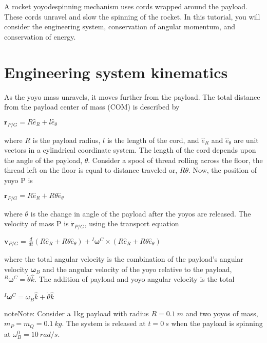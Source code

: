 \documentclass[letterpaper,10pt,english]{sphinxmanual}
\begin{document}
A rocket yoyo\sphinxhyphen{}despinning mechanism uses cords wrapped around the
payload. These cords unravel and slow the spinning of the rocket. In
this tutorial, you will consider the engineering system, conservation of
angular momentum, and conservation of energy.


\section{Engineering system \sphinxhyphen{} kinematics}
\label{\detokenize{module_04/yoyo-despin_02:engineering-system-kinematics}}
As the yoyo mass unravels, it moves further from the payload. The total
distance from the payload center of mass (COM) is described by

\(\mathbf{r}_{P/G} = R\hat{e}_R + l\hat{e}_{\theta}\)

where \(R\) is the payload radius, \(l\) is the length of the cord, and
\(\hat{e}_R\) and \(\hat{e}_{\theta}\) are unit vectors in a cylindrical
coordinate system. The length of the cord depends upon the angle of the
payload, \(\theta\). Consider a spool of thread rolling across the floor,
the thread left on the floor is equal to distance traveled or,
\(R\theta\). Now, the position of yoyo P is

\(\mathbf{r}_{P/G} = R\hat{e}_R + R\theta\hat{e}_{\theta}\)

where \(\theta\) is the change in angle of the payload after the yoyos are
released. The velocity of mass P is \(\dot{\mathbf{r}}_{P/G}\), using the transport
equation

\(\mathbf{v}_{P/G} = \frac{d}{dt}(R\hat{e}_R + R\theta\hat{e}_{\theta}) +
{}^I\mathbf{\omega}^C \times(R\hat{e}_R + R\theta\hat{e}_{\theta})\)

where the total angular velocity is the combination of the payload’s
angular velocity \(\mathbf{\omega}_B\) and the angular velocity of the
yoyo relative to the payload, \({}^B \mathbf{\omega}^C=\dot{\theta}\hat{k}\). The addition of
payload and yoyo angular velocity is the total

\({}^I\mathbf{\omega}^C = \omega_B \hat{k} +
\dot{\theta}\hat{k}\)

\begin{sphinxadmonition}{note}{Note:}
Consider a 1\sphinxhyphen{}kg payload with radius \(R=0.1~m\) and two yoyos of mass,
\(m_P=m_Q=0.1~kg\). The system is released at \(t = 0~s\) when the payload
is spinning at \(\omega_B^0=10~rad/s\).
\end{sphinxadmonition}
\end{document}
